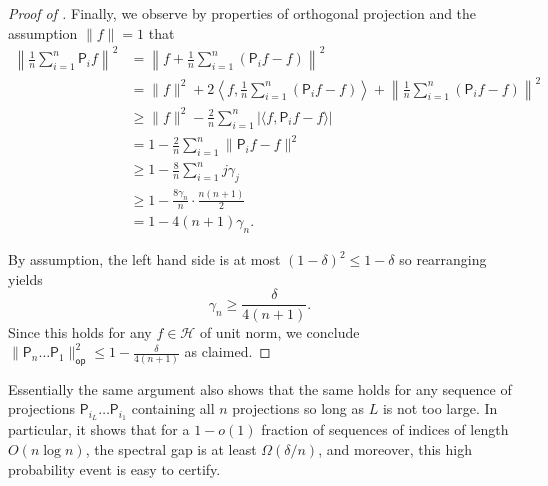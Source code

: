 \documentclass[11pt]{article}
\begin{document}
\begin{proof}[Proof of ]
Finally, we observe by properties of orthogonal projection and the assumption $\|f\|=1$ that
\begin{align*}
    \left\| \frac{1}{n}\sum_{i=1}^n \mathsf{P}_if\right\|^2&=\left\|f+ \frac{1}{n}\sum_{i=1}^n (\mathsf{P}_if-f)\right\|^2\\
    &=\|f\|^2+2\left\langle f,\frac{1}{n}\sum_{i=1}^n (\mathsf{P}_if-f)\right\rangle+\left\|\frac{1}{n}\sum_{i=1}^n (\mathsf{P}_if-f)\right\|^2\\
    &\geq \|f\|^2-\frac{2}{n}\sum_{i=1}^n \vert \langle f,\mathsf{P}_if-f\rangle\vert\\
    &=1-\frac{2}{n}\sum_{i=1}^n \|\mathsf{P}_if-f\|^2\\
    &\geq 1-\frac{8}{n}\sum_{i=1}^n j\gamma_j\\
    &\geq 1-\frac{8\gamma_n}{n}\cdot \frac{n(n+1)}{2}\\
    &=1-4(n+1)\gamma_n.
\end{align*}


By assumption, the left hand side is at most $(1-\delta)^2\leq 1-\delta$ so rearranging yields
\begin{equation*}
    \gamma_n \geq \frac{\delta}{4(n+1)}.
\end{equation*}
Since this holds for any $f\in \mathcal{H}$ of unit norm, we conclude $\|\mathsf{P}_{n}\ldots \mathsf{P}_1\|_{\mathsf{op}}^2\leq 1-\frac{\delta}{4(n+1)}$ as claimed.
\end{proof}

Essentially the same argument also shows that the same holds for any sequence of projections $\mathsf{P}_{i_L}\ldots \mathsf{P}_{i_1}$ containing all $n$ projections so long as $L$ is not too large. In particular, it shows that for a $1-o(1)$ fraction of sequences of indices of length $O(n\log n)$, the spectral gap is at least $\Omega(\delta/n)$, and moreover, this high probability event is easy to certify.
\fi
\end{document}
